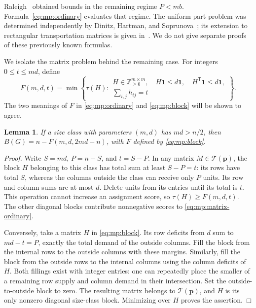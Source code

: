 \documentclass[10pt,a4paper]{amsart}
\numberwithin{equation}{section}
\newtheorem{lemma}[theorem]{Lemma}
\theoremstyle{definition}
\theoremstyle{remark}
\begin{document}
Raleigh~\cite[Theorems~2--3]{raleigh2018} obtained bounds in the
remaining regime $P<mb$. Formula~\eqref{eq:mp:ordinary} evaluates
that regime. The uniform-part problem was determined independently
by Dinitz, Hartman, and Soprunova~\cite{dinitz2012}; its extension
to rectangular transportation matrices is given in~\cite{gajula2015}.
We do not give separate proofs of these previously known formulas.

We isolate the matrix problem behind the remaining case. For integers
$0\le t\le md$, define
\begin{equation}\label{eq:mp:block}
 F(m,d,t)=\min\left\{\tau(H):
 \begin{array}{l}
 H\in\mathbb Z_{\ge0}^{m\times m},\quad
 H\mathbf1\le d\mathbf1,\quad H^{\mathsf T}\mathbf1\le d\mathbf1,\\
 \displaystyle\sum_{i,j}h_{ij}=t
 \end{array}\right\}.
\end{equation}
The two meanings of $F$ in \eqref{eq:mp:ordinary} and
\eqref{eq:mp:block} will be shown to agree.

\begin{lemma}\label{lem:mp:dominant-block}
If a size class with parameters $(m,d)$ has $md>n/2$, then
$B(G)=n-F(m,d,2md-n)$, with $F$ defined by \eqref{eq:mp:block}.
\end{lemma}
\begin{proof}
Write $S=md$, $P=n-S$, and $t=S-P$. In any matrix
$M\in\mathcal T(\mathbf p)$, the block $H$ belonging to this class
has total sum at least $S-P=t$: its rows have total $S$, whereas the
columns outside the class can receive only $P$ units. Its row and column
sums are at most $d$. Delete units from its entries until its total is
$t$. This operation cannot increase an assignment score, so
$\tau(H)\ge F(m,d,t)$. The other diagonal blocks contribute
nonnegative scores to \eqref{eq:mp:matrix-ordinary}.

Conversely, take a matrix $H$ in \eqref{eq:mp:block}. Its row deficits
from $d$ sum to $md-t=P$, exactly the total demand of the outside
columns. Fill the block from the internal rows to the outside columns
with these margins. Similarly, fill the block from the outside rows to
the internal columns using the column deficits of $H$. Both fillings
exist with integer entries: one can repeatedly place the smaller of a
remaining row supply and column demand in their intersection. Set the
outside-to-outside block to zero. The resulting matrix belongs to
$\mathcal T(\mathbf p)$, and $H$ is its only nonzero diagonal size-class
block. Minimizing over $H$ proves the assertion.
\end{proof}
\end{document}
